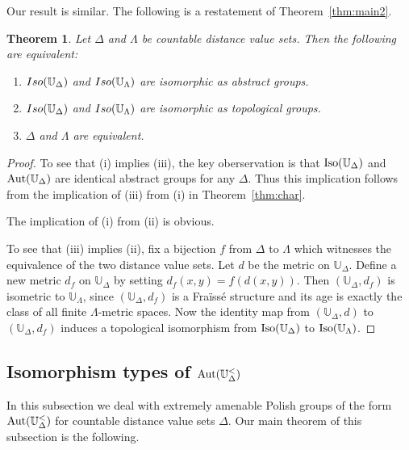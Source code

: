 \documentclass{amsart}
\newtheorem{theorem}{Theorem}[section]
\theoremstyle{definition}
\theoremstyle{remark}
\begin{document}
Our result is similar. The following is a restatement of Theorem~\ref{thm:main2}.

 \begin{theorem}\label{thm:remain2}
        Let $\Delta$ and $\Lambda$ be countable distance value sets. Then the following are equivalent: 
        \begin{enumerate}
            \item[\rm (i)] ${\rm Iso}(\mathbb{U}_\Delta)$ and ${\rm Iso}(\mathbb{U}_\Lambda)$ are isomorphic as abstract groups.  
            \item[\rm (ii)] ${\rm Iso}(\mathbb{U}_\Delta)$ and ${\rm Iso}(\mathbb{U}_\Lambda)$ are isomorphic as topological groups. 
            \item[\rm (iii)] $\Delta$ and $\Lambda$ are equivalent. 
        \end{enumerate}
    \end{theorem}

\begin{proof} To see that (i) implies (iii), the key oberservation is that $\mbox{\rm Iso}(\mathbb{U}_\Delta)$ and $\mbox{\rm Aut}(\mathbb{U}_\Delta)$ are identical abstract groups for any $\Delta$. Thus this implication follows from the implication of (iii) from (i) in Theorem~\ref{thm:char}. 

The implication of (i) from (ii) is obvious. 

To see that (iii) implies (ii), fix a bijection $f$ from $\Delta$ to $\Lambda$ which witnesses the equivalence of the two distance value sets. Let $d$ be the metric on $\mathbb{U}_\Delta$. Define a new metric $d_f$ on $\mathbb{U}_\Delta$ by setting $d_f(x,y)=f(d(x,y))$. Then $(\mathbb{U}_\Delta, d_f)$ is isometric to $\mathbb{U}_\Lambda$, since $(\mathbb{U}_\Delta, d_f)$ is a Fra\"iss\'e structure and its age is exactly the class of all finite $\Lambda$-metric spaces. Now the identity map from $(\mathbb{U}_\Delta,d)$ to $(\mathbb{U}_\Delta, d_f)$ induces a topological isomorphism from $\mbox{\rm Iso}(\mathbb{U}_\Delta)$ to $\mbox{\rm Iso}(\mathbb{U}_\Lambda)$. 
\end{proof}


\subsection{Isomorphism types of $\mbox{\rm Aut}(\mathbb{U}^<_\Delta)$} 
In this subsection we deal with extremely amenable Polish groups of the form $\mbox{\rm Aut}(\mathbb{U}^<_\Delta)$ for countable distance value sets $\Delta$. Our main theorem of this subsection is the following.
\end{document}
